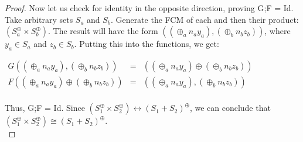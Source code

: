 \begin{lemma}
\begin{proof}
Now let us check for identity in the opposite direction, proving G;F = Id.\\
Take arbitrary sets $S_a$ and $S_b$. Generate the FCM of each and then their product: $(S_a^\oplus \times S_b^\oplus)$. The result will have the form $((\oplus_a n_a y_a), (\oplus_b n_b z_b))$, where $y_a \in S_a$ and $z_b \in S_b$. Putting this into the functions, we get:\\
\begin{center}
  \begin{math}
    \begin{array}{lll}
     G((\oplus_a n_a y_a), (\oplus_b n_b z_b)) & = & ((\oplus_a n_a y_a) \oplus (\oplus_b n_b z_b)) \\
     F((\oplus_a n_a y_a) \oplus (\oplus_b n_b z_b)) & = & ((\oplus_a n_a y_a), (\oplus_b n_b z_b))\\
    \end{array}
  \end{math}
\end{center}
 
Thus, G;F = Id. 
Since $(S_1 ^\oplus \times S_2 ^\oplus) \leftrightarrow (S_1 + S_2)^\oplus$, we can conclude that $(S_1 ^\oplus \times S_2 ^\oplus) \cong (S_1 + S_2)^\oplus$.\\
\end{proof}
%
\end{lemma}
%
